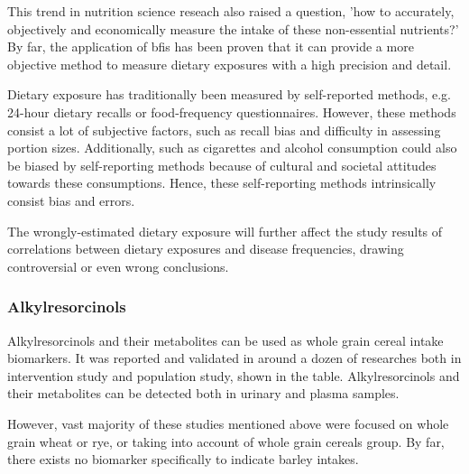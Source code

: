 This trend in nutrition science reseach also raised a question, 'how to accurately, objectively and economically measure the intake of these non-essential nutrients?' By far, the application of \acrfull{bfis} has been proven that it can provide a more objective method to measure dietary exposures with a high precision and detail\cite{Scalbert2014}.

Dietary exposure has traditionally been measured by self-reported methods, e.g. 24-hour dietary recalls or food-frequency questionnaires\cite{Rutishauser2005DietaryMeasurements.}. 
However, these methods consist a lot of subjective factors, such as recall bias and difficulty in assessing portion sizes\cite{Scalbert2014}. 
Additionally, such as cigarettes and alcohol consumption could also be biased by self-reporting methods because of cultural and societal attitudes towards these consumptions. 
Hence, these self-reporting methods intrinsically consist bias and errors.

The wrongly-estimated dietary exposure will further affect the study results of correlations between dietary exposures and disease frequencies, drawing controversial or even wrong conclusions\cite{Scalbert2014}.

\subsubsection{Alkylresorcinols}
Alkylresorcinols and their metabolites can be used as whole grain cereal intake biomarkers.
It was reported and validated in around a dozen of researches both in intervention study and population study, shown in the table.
Alkylresorcinols and their metabolites can be detected both in urinary and plasma samples.

However, vast majority of these studies mentioned above were focused on whole grain wheat or rye, or taking into account of whole grain cereals group. By far, there exists no biomarker specifically to indicate barley intakes.


